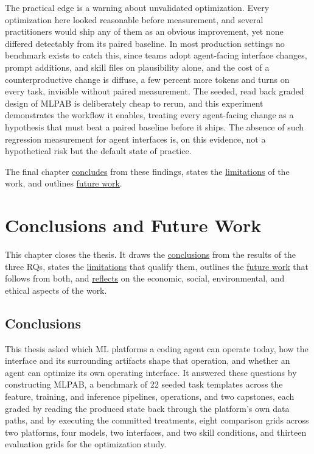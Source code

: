 \documentclass[
english,                 %
bibtex,                  %
]{kththesis}
\numberwithin{listing}{chapter}
\begin{document}
The practical edge is a warning about unvalidated optimization. Every optimization here looked reasonable before measurement, and several practitioners would ship any of them as an obvious improvement, yet none differed detectably from its paired baseline. In most production settings no benchmark exists to catch this, since teams adopt agent-facing interface changes, prompt additions, and skill files on plausibility alone, and the cost of a counterproductive change is diffuse, a few percent more tokens and turns on every task, invisible without paired measurement. The seeded, read back graded design of \gls{MLPAB} is deliberately cheap to rerun, and this experiment demonstrates the workflow it enables, treating every agent-facing change as a hypothesis that must beat a paired baseline before it ships. The absence of such regression measurement for agent interfaces is, on this evidence, not a hypothetical risk but the default state of practice.

The final chapter \hyperref[sec:concl_conclusions]{concludes} from these findings, states the \hyperref[sec:concl_limitations]{limitations} of the work, and outlines \hyperref[sec:concl_future_work]{future work}.

\cleardoublepage

\chapter{Conclusions and Future Work}
\label{ch:conclusions_and_future_work}
\glsresetall

This chapter closes the thesis. It draws the \hyperref[sec:concl_conclusions]{conclusions} from the results of the three \glspl{RQ}, states the \hyperref[sec:concl_limitations]{limitations} that qualify them, outlines the \hyperref[sec:concl_future_work]{future work} that follows from both, and \hyperref[sec:reflections]{reflects} on the economic, social, environmental, and ethical aspects of the work.

\section{Conclusions}
\label{sec:concl_conclusions}
\glsresetall

This thesis asked which \gls{ML} platforms a coding agent can operate today, how the interface and its surrounding artifacts shape that operation, and whether an agent can optimize its own operating interface. It answered these questions by constructing \gls{MLPAB}, a benchmark of 22 seeded task templates across the feature, training, and inference pipelines, operations, and two capstones, each graded by reading the produced state back through the platform's own data paths, and by executing the committed treatments, eight comparison grids across two platforms, four models, two interfaces, and two skill conditions, and thirteen evaluation grids for the optimization study.
\end{document}
